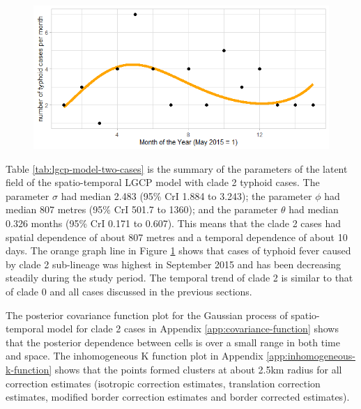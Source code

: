 \hspace*{2pt}

\begin{figure}[H]
    \begin{center}
        \includegraphics[scale=0.85]{Long term trend of temporal model - Major 2.png}
    \end{center}
     \label{fig:temporal-distribution-two-cases}
\end{figure}

Table \ref{tab:lgcp-model-two-cases} is the summary of the parameters of the latent field of the spatio-temporal LGCP model with clade 2 typhoid cases. The parameter $\sigma$ had median 2.483 (95\% CrI 1.884 to 3.243); the parameter $\phi$ had median 807 metres (95\% CrI 501.7 to 1360); and the parameter $\theta$ had median 0.326 months (95\% CrI 0.171 to 0.607). This means that the clade 2 cases had spatial dependence of about 807 metres and a temporal dependence of about 10 days. The orange graph line in Figure \ref{fig:temporal-distribution-two-cases} shows that cases of typhoid fever caused by clade 2 sub-lineage was highest in September 2015 and has been decreasing steadily during the study period. The temporal trend of clade 2 is similar to that of clade 0 and all cases discussed in the previous sections.

The posterior covariance function plot for the Gaussian process of spatio-temporal model for clade 2 cases in Appendix \ref{app:covariance-function} shows that the posterior dependence between cells is over a small range in both time and space. The inhomogeneous K function plot in Appendix \ref{app:inhomogeneous-k-function} shows that the points formed clusters at about 2.5km radius for all correction estimates (isotropic correction estimates, translation correction estimates, modified border correction estimates and border corrected estimates).

